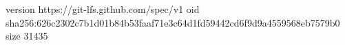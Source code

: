 version https://git-lfs.github.com/spec/v1
oid sha256:626c2302c7b1d01b84b53faaf71e3c64d1fd59442cd6f9d9a4559568eb7579b0
size 31435
